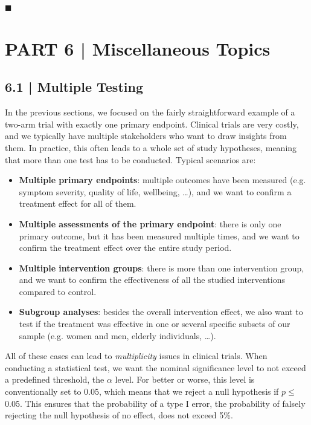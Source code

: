 \begin{flushright}
    $\blacksquare$
\end{flushright}

\section{{\textsf{\textcolor{sBlue}{\small PART 6 |}}} Miscellaneous Topics}


\subsection{{\normalfont\textsf{\textcolor{sBlue}{\small 6.1 |}}} Multiple Testing}

In the previous sections, we focused on the fairly straightforward example of a two-arm trial with exactly one primary endpoint. Clinical trials are very costly, and we typically have multiple stakeholders who want to draw insights from them. In practice, this often leads to a whole set of study hypotheses, meaning that more than one test has to be conducted. Typical scenarios are:

\begin{itemize}
    \item \textbf{Multiple primary endpoints}: multiple outcomes have been measured (e.g. symptom severity, quality of life, wellbeing, \dots), and we want to confirm a treatment effect for all of them.
    \item \textbf{Multiple assessments of the primary endpoint}: there is only one primary outcome, but it has been measured multiple times, and we want to confirm the treatment effect over the entire study period.
    \item \textbf{Multiple intervention groups}: there is more than one intervention group, and we want to confirm the effectiveness of all the studied interventions compared to control.
    \item \textbf{Subgroup analyses}: besides the overall intervention effect, we also want to test if the treatment was effective in one or several specific subsets of our sample (e.g. women and men, elderly individuals, \dots).
\end{itemize}

All of these cases can lead to \emph{multiplicity} issues in clinical trials. When conducting a statistical test, we want the nominal significance level to not exceed a predefined threshold, the $\alpha$ level. For better or worse, this level is conventionally set to 0.05, which means that we reject a null hypothesis if $p\leq$ 0.05. This ensures that the probability of a type I error, the probability of falsely rejecting the null hypothesis of no effect, does not exceed 5\%.

